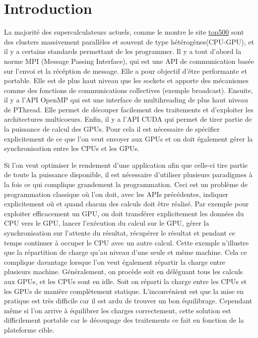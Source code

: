 \documentclass[smallextended]{svjour3}
\begin{document}
\section{Introduction}
\label{sec-1}

La majorité des supercalculateurs actuels, comme le montre le site
\href{http://www.top500.org}{top500} sont des clusters massivement parallèles et souvent de type
hétérogènes(CPU-GPU), et il y a certains standards permettant de
les programmer. Il y a tout d'abord la norme MPI (Message Passing Interface),
qui est une API de communication basée sur l'envoi et la
récéption de message. Elle a pour objectif d'être performante et
portable.  Elle est de plus haut niveau que les sockets et apporte
des mécanismes comme des fonctions de communications collectives
(exemple broadcast). Ensuite, il y a l'API OpenMP qui est une
interface de multihreading de plus haut niveau de PThread. Elle
permet de découper facilement des traitements et d'exploiter les
architectures multicoeurs. Enfin, il y a l'API CUDA qui permet de tirer partie de
la puissance de calcul des GPUs. Pour cela il est nécessaire de
spécifier explicitement de ce que l'on veut envoyer aux GPUs et on
doit également gérer la synchronisation entre les CPUs et les GPUs.   

Si l'on veut optimiser le rendement d'une application afin que
celle-ci tire partie de toute la puissance disponible, il est
nécessaire d'utiliser plusieurs paradigmes à la fois ce qui complique
grandement la programmation. Ceci est un problème de programmation
classique où l'on doit, avec les APIs précédentes, indiquer explicitement où et
quand chacun des calculs doit être réalisé. Par exemple pour exploiter
efficacement un GPU, on doit transférer explicitement les données du
CPU vers le GPU, lancer l'exécution du calcul sur le GPU, gérer la
synchronisation sur l'attente du résultat, récupérer le résultat et
pendant ce temps continuer à occuper le CPU avec un autre calcul.
Cette exemple n'illustre que la répartition de charge qu'au niveau
d'une seule et même machine. Cela ce complique davantage lorsque
l'on veut également répartir la charge entre plusieurs machine.
Généralement, on procède soit en déléguant tous les calculs aux
GPUs, et les CPUs sont en idle. Soit on réparti la charge entre les
CPUs et les GPUs de manière complètement
statique\cite{StarPU-MPI}. L'inconvénient est que la mise en 
pratique est très difficile car il est ardu de trouver un bon
équilibrage. Cependant même si l'on arrive à équilibrer les charges
correctement, cette solution est difficilement portable car le
découpage des traitements ce fait en fonction de la plateforme
cible. 
\end{document}
